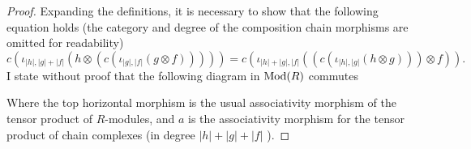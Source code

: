 \begin{proof}
    Expanding the definitions, it is necessary to show that the following equation holds (the category and degree of the composition chain morphisms are omitted for readability)
    \begin{equation}
        \label{eq:dg-composition_associative}
        c(\iota_{|h|, |g| + |f|}(h \otimes (c(\iota_{|g|, |f|}(g \otimes f))))) = c(\iota_{|h| + |g|, |f|}((c(\iota_{|h|, |g|}(h \otimes g))) \otimes f)).
    \end{equation}
    I state without proof that the following diagram in \( \operatorname{Mod}(R) \) commutes
    \begin{center}
    \end{center}
    Where the top horizontal morphism is the usual associativity morphism of the tensor product of \( R \)-modules, and \( a \) is the associativity morphism for the tensor product of chain complexes (in degree \( |h| + |g| + |f| \) ).


\end{proof}
